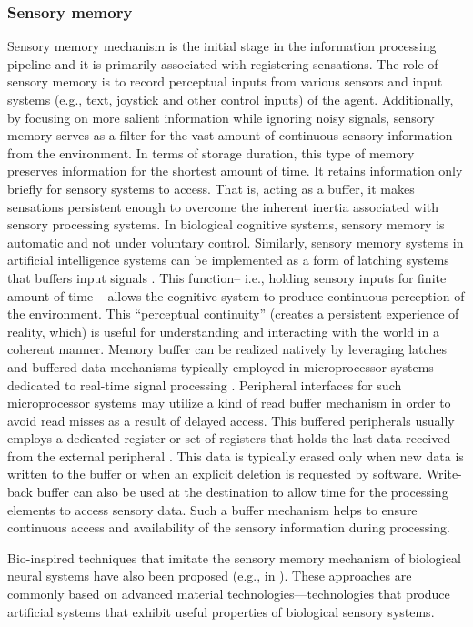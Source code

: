 \documentclass[10pt,journal,compsoc]{IEEEtran}
\begin{document}
	\subsubsection{Sensory memory}
	Sensory memory mechanism is the initial stage in the information processing pipeline and it is primarily associated with registering sensations.  The role of sensory memory is to record perceptual inputs from various sensors and input systems (e.g., text, joystick and other control inputs) of the agent. Additionally, by focusing on more salient information while ignoring noisy signals, sensory memory serves as a filter for the vast amount of continuous sensory information from the environment. In terms of storage duration, this type of memory preserves information for the shortest amount of time. It retains information only briefly for sensory systems to access. That is, acting as a buffer, it makes sensations persistent enough to overcome the inherent inertia associated with sensory processing systems.  In biological cognitive systems, sensory memory is automatic and not under voluntary control. Similarly, sensory memory systems in artificial intelligence systems can be implemented as a form of latching systems that buffers input signals \cite{ali2024robots,minnella2023mix}. This function– i.e., holding sensory inputs for finite amount of time – allows the cognitive system to produce continuous perception of the environment. This “perceptual continuity” (creates a persistent experience of reality, which) is useful for understanding and interacting with the world in a coherent manner. 
	Memory buffer can be realized natively by leveraging latches and buffered data mechanisms typically employed in microprocessor systems dedicated to real-time signal processing \cite{minnella2023mix,meaney2024synchronous}.  Peripheral interfaces for such microprocessor systems may utilize a kind of read buffer mechanism in order to avoid read misses as a result of delayed access.  This buffered peripherals usually employs a dedicated register or set of registers that holds the last data received from the external peripheral \cite{grotschla2023design,leis2023virtual}. This data is typically erased only when new data is written to the buffer or when an explicit deletion is requested by software. Write-back buffer can also be used at the destination to allow time for the processing elements to access sensory data. Such a buffer mechanism helps to ensure continuous access and availability of the sensory information during processing.
	
	Bio-inspired techniques that imitate the sensory memory mechanism of biological neural systems have also been proposed (e.g., in \cite{wan2020artificial,ji2023brain}).  These approaches are commonly based on advanced material technologies—technologies that produce artificial systems that exhibit useful properties of biological sensory systems. 
	
\end{document}
